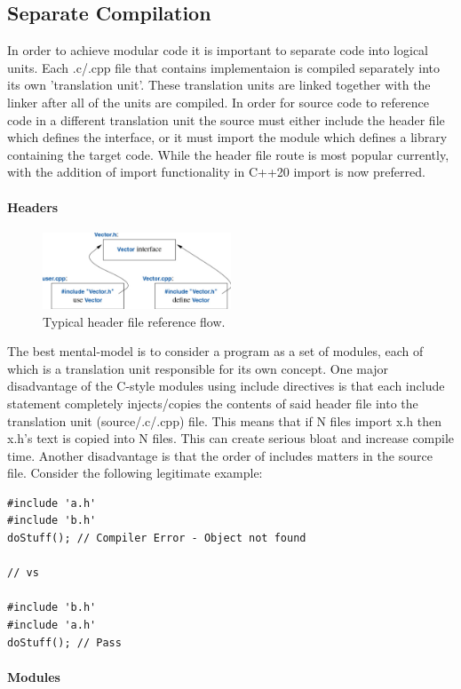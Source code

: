 \documentclass[a4paper, 10pt]{article}
\begin{document}
\subsection{Separate Compilation}
In order to achieve modular code it is important to separate code into logical units. Each .c/.cpp file that contains implementaion is compiled separately into its own 'translation unit'. These translation units are linked together with the linker after all of the units are compiled. In order for source code to reference code in a different translation unit the source must either include the header file which defines the interface, or it must import the module which defines a library containing the target code. While the header file route is most popular currently, with the addition of import functionality in C++20 import is now preferred.
\paragraph {Headers}
\begin{figure}[ht]
	\centering
	\includegraphics[width=0.5\textwidth]{images/header.png}
	\caption{Typical header file reference flow.}
\end{figure}

The best mental-model is to consider a program as a set of modules, each of which is a translation unit responsible for its own concept. One major disadvantage of the C-style modules using include directives is that each include statement completely injects/copies the contents of said header file into the translation unit (source/.c/.cpp) file. This means that if N files import x.h then x.h's text is copied into N files. This can create serious bloat and increase compile time. Another disadvantage is that the order of includes matters in the source file. Consider the following legitimate example:
\begin{lstlisting}[style=cpp]
#include 'a.h'
#include 'b.h'
doStuff(); // Compiler Error - Object not found

// vs

#include 'b.h'
#include 'a.h'
doStuff(); // Pass
\end{lstlisting}
\paragraph{Modules}
\end{document}
